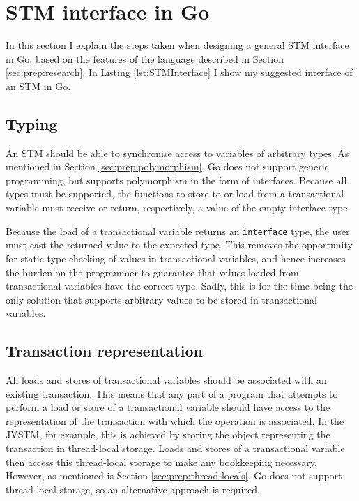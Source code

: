 \documentclass[12pt,a4paper,oneside,openright]{report}
\newcommand{\goType}[1]{\texttt{#1}}
\begin{document}
\section{STM interface in Go}
\label{sec:design-decisions}

In this section I explain the steps taken when designing a general STM
interface in Go, based on the features of the language described in
Section \ref{sec:prep:research}. In Listing \ref{lst:STMInterface} I
show my suggested interface of an STM in Go.

\subsection{Typing}
\label{sec:typing}

An STM should be able to synchronise access to variables of arbitrary
types. As mentioned in Section \ref{sec:prep:polymorphism}, Go does
not support generic programming, but supports polymorphism in the form
of interfaces. Because all types must be supported, the functions to
store to or load from a transactional variable must receive or return,
respectively, a value of the empty interface type.

Because the load of a transactional variable returns an
\goType{interface\string{\string}} type, the user must cast the
returned value to the expected type. This removes the opportunity for
static type checking of values in transactional variables, and hence
increases the burden on the programmer to guarantee that values loaded
from transactional variables have the correct type. Sadly, this is for
the time being the only solution that supports arbitrary values to be
stored in transactional variables.

\subsection{Transaction representation}
\label{sec:expl-trans-objects}

All loads and stores of transactional variables should be associated
with an existing transaction. This means that any part of a program
that attempts to perform a load or store of a transactional variable
should have access to the representation of the transaction with which
the operation is associated. In the JVSTM, for example, this is
achieved by storing the object representing the transaction in
thread-local storage. Loads and stores of a transactional variable
then access this thread-local storage to make any bookkeeping
necessary. However, as mentioned is Section
\ref{sec:prep:thread-locals}, Go does not support thread-local
storage, so an alternative approach is required.
\end{document}
